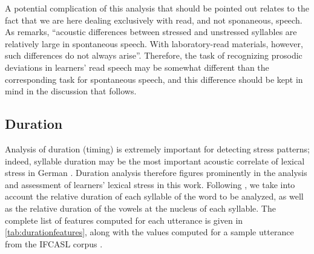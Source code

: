	A potential complication of this analysis that should be pointed out relates to the fact that we are here dealing exclusively with read, and not sponaneous, speech. As \textcite[p.~275]{Cutler2005} remarks, ``acoustic differences between stressed and unstressed syllables are relatively large in spontaneous speech. With laboratory-read materials, however, such differences do not always arise''. Therefore, the task of recognizing prosodic deviations in learners' read speech may be somewhat different than the corresponding task for spontaneous speech, and this difference should be kept in mind in the discussion that follows.

	\subsection{Duration}
	\label{sec:prosody:duration}
	Analysis of duration (timing) is extremely important for detecting stress patterns;
indeed, syllable duration may be the most important acoustic correlate of lexical stress in German \citep{Dogil1999}.
Duration analysis therefore figures prominently in the analysis and assessment of learners' lexical stress in this work. Following \textcite{Bonneau2011}, we take into account the relative duration of each syllable of the word to be analyzed, as well as the relative duration of the vowels at the nucleus of each syllable. 
The complete list of features computed for each utterance is given in \cref{tab:durationfeatures}, 
along with the values computed for a sample utterance from the IFCASL corpus . 




